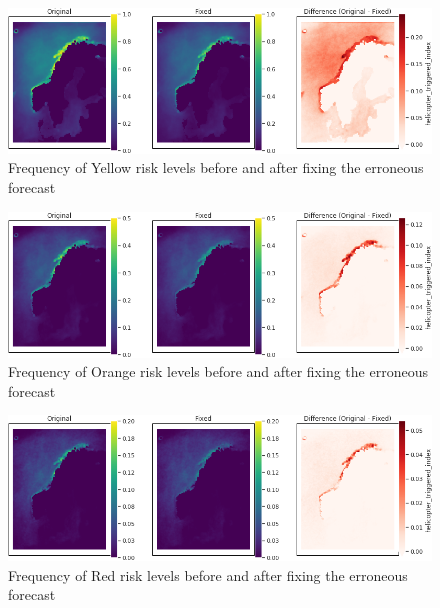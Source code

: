 \begin{figure}
    \centering
    \includegraphics[width=\textwidth]{Figures/climatologyyellow.png}
    \caption{Frequency of Yellow risk levels before and after fixing the erroneous forecast}
    \label{fig:fixred}
\end{figure}

\begin{figure}
    \centering
    \includegraphics[width=\textwidth]{Figures/climatologyorange.png}
    \caption{Frequency of Orange risk levels before and after fixing the erroneous forecast}
    \label{fig:fixorange}
\end{figure}

\begin{figure}
    \centering
    \includegraphics[width=\textwidth]{Figures/climatologyred.png}
    \caption{Frequency of Red risk levels before and after fixing the erroneous forecast}
    \label{fig:fixyellow}
\end{figure}

